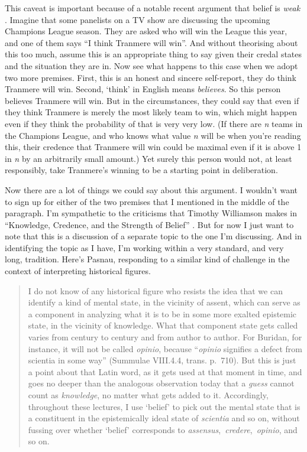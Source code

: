 \documentclass[
  11pt,
]{book}
\begin{document}
This caveat is important because of a notable recent argument that belief is \emph{weak} \citep{HawthorneEtAl2015}. Imagine that some panelists on a TV show are discussing the upcoming Champions League season. They are asked who will win the League this year, and one of them says ``I think Tranmere will win''. And without theorising about this too much, assume this is an appropriate thing to say given their credal states and the situation they are in. Now see what happens to this case when we adopt two more premises. First, this is an honest and sincere self-report, they do think Tranmere will win. Second, `think' in English means \emph{believes}. So this person believes Tranmere will win. But in the circumstances, they could say that even if they think Tranmere is merely the most likely team to win, which might happen even if they think the probability of that is very very low. (If there are \emph{n} teams in the Champions League, and who knows what value \emph{n} will be when you're reading this, their credence that Tranmere will win could be maximal even if it is above 1 in \emph{n} by an arbitrarily small amount.) Yet surely this person would not, at least responsibly, take Tranmere's winning to be a starting point in deliberation.

Now there are a lot of things we could say about this argument. I wouldn't want to sign up for either of the two premises that I mentioned in the middle of the paragraph. I'm sympathetic to the criticisms that Timothy Williamson makes in ``Knowledge, Credence, and the Strength of Belief'' \citep{Williamson2022}. But for now I just want to note that this is a discussion of a separate topic to the one I'm discussing. And in identifying the topic as I have, I'm working within a very standard, and very long, tradition. Here's Pasnau, responding to a similar kind of challenge in the context of interpreting historical figures.

\begin{quote}
I do not know of any historical figure who resists the idea that we can identify a kind of mental state, in the vicinity of assent, which can serve as a component in analyzing what it is to be in some more exalted epistemic state, in the vicinity of knowledge. What that component state gets called varies from century to century and from author to author. For Buridan, for instance, it will not be called \emph{opinio}, because ``\emph{opinio} signifies a defect from scientia in some way'' (Summulae VIII.4.4, trans. p.~710). But this is just a point about that Latin word, as it gets used at that moment in time, and goes no deeper than the analogous observation today that a \emph{guess} cannot count as \emph{knowledge}, no matter what gets added to it. Accordingly, throughout these lectures, I use `belief' to pick out the mental state that is a constituent in the epistemically ideal state of \emph{scientia} and so on, without fussing over whether `belief' corresponds to \emph{assensus},~\emph{credere},~\emph{opinio}, and so on. \citep[219]{Pasnau2017}
\end{quote}
\end{document}
